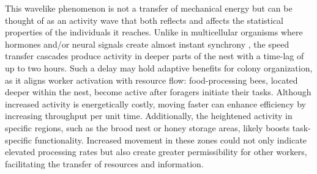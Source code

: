 \documentclass{article}
\begin{document}
This wavelike phenomenon is not a transfer of mechanical energy but can be thought of as an activity wave that both reflects and affects the statistical properties of the individuals it reaches. Unlike in multicellular organisms where hormones and/or neural signals create almost instant synchrony \cite{finger_coupled_2020}, the speed transfer cascades produce activity in deeper parts of the nest with a time-lag of up to two hours. Such a delay may hold adaptive benefits for colony organization, as it aligns worker activation with resource flow: food-processing bees, located deeper within the nest, become active after foragers initiate their tasks.
Although increased activity is energetically costly, moving faster can enhance efficiency by increasing throughput per unit time. Additionally, the heightened activity in specific regions, such as the brood nest or honey storage areas, likely boosts task-specific functionality. Increased movement in these zones could not only indicate elevated processing rates but also create greater permissibility for other workers, facilitating the transfer of resources and information.


 
\end{document}
